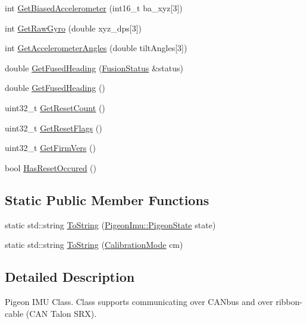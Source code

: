 \begin{DoxyCompactItemize}
\item 
int \hyperlink{class_pigeon_imu_a23e6b7c92da8fd31604c238bd204abd0}{Get\+Biased\+Accelerometer} (int16\+\_\+t ba\+\_\+xyz\mbox{[}3\mbox{]})
\item 
int \hyperlink{class_pigeon_imu_a2b55d63b3aedea9a9adb4a407e590b8b}{Get\+Raw\+Gyro} (double xyz\+\_\+dps\mbox{[}3\mbox{]})
\item 
int \hyperlink{class_pigeon_imu_a6602abacdfbbebe812355fc0798d51ea}{Get\+Accelerometer\+Angles} (double tilt\+Angles\mbox{[}3\mbox{]})
\item 
double \hyperlink{class_pigeon_imu_a4d1264230776fa2be5e9a63f1ae0a41d}{Get\+Fused\+Heading} (\hyperlink{struct_pigeon_imu_1_1_fusion_status}{Fusion\+Status} \&status)
\item 
double \hyperlink{class_pigeon_imu_ab74361f2d6deab870df7b5eb41309380}{Get\+Fused\+Heading} ()
\item 
uint32\+\_\+t \hyperlink{class_pigeon_imu_abf5fe406769d034b5e58ffb8d1438b4e}{Get\+Reset\+Count} ()
\item 
uint32\+\_\+t \hyperlink{class_pigeon_imu_aac22214226d6cd5b286136fa080f8dfa}{Get\+Reset\+Flags} ()
\item 
uint32\+\_\+t \hyperlink{class_pigeon_imu_ad5954805f7a9cc1f6fe2465b9da9a0e4}{Get\+Firm\+Vers} ()
\item 
bool \hyperlink{class_pigeon_imu_a0cd34c3c78fe5032c9daa80b0f56f307}{Has\+Reset\+Occured} ()
\end{DoxyCompactItemize}
\subsection*{Static Public Member Functions}
\begin{DoxyCompactItemize}
\item 
static std\+::string \hyperlink{class_pigeon_imu_aeb52c61b481d04d783b195bdaa5299b1}{To\+String} (\hyperlink{class_pigeon_imu_af08e19459beb068e840719205fa46c39}{Pigeon\+Imu\+::\+Pigeon\+State} state)
\item 
static std\+::string \hyperlink{class_pigeon_imu_a234d994be6361c91cd58cbd754ad52c6}{To\+String} (\hyperlink{class_pigeon_imu_a1d73ea84ad5c812e809698fab0b9b490}{Calibration\+Mode} cm)
\end{DoxyCompactItemize}


\subsection{Detailed Description}
Pigeon I\+MU Class. Class supports communicating over C\+A\+Nbus and over ribbon-\/cable (C\+AN Talon S\+RX). 

